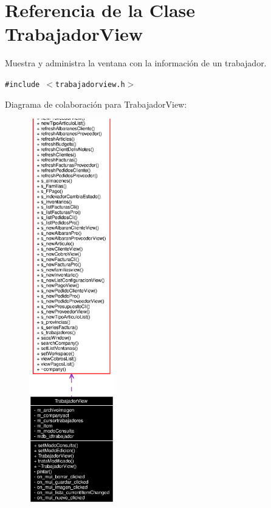 \section{Referencia de la Clase Trabajador\-View}
\label{classTrabajadorView}
Muestra y administra la ventana con la informaci\'{o}n de un trabajador.  


{\tt \#include $<$trabajadorview.h$>$}

Diagrama de colaboraci\'{o}n para Trabajador\-View:\begin{figure}[H]
\begin{center}
\leavevmode
\includegraphics[width=105pt]{classTrabajadorView__coll__graph}
\end{center}
\end{figure}
